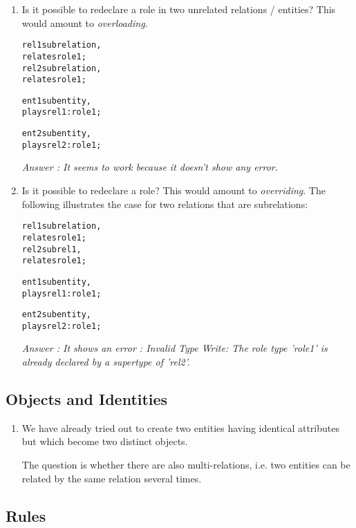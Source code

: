 \documentclass[runningheads]{llncs}
\begin{document}
\begin{enumerate}
\item Is it possible to redeclare a role in two unrelated relations /
  entities? This would amount to \emph{overloading}.

  \begin{alltt}
rel1 sub relation,
     relates role1;
rel2 sub relation,
     relates role1;

ent1 sub entity,
  plays rel1:role1;

ent2 sub entity,
  plays rel2:role1;
  \end{alltt}
  
 
\emph{Answer : It seems to work because it doesn't show any error. }
 
\item Is it possible to redeclare a role? This would amount to
  \emph{overriding}. The following illustrates the case for two relations that
  are subrelations:
  
  \begin{alltt}
rel1 sub relation,
     relates role1;
rel2 sub rel1,
     relates role1;

ent1 sub entity,
  plays rel1:role1;

ent2 sub entity,
  plays rel2:role1;
  \end{alltt}

\emph{Answer : It shows an error : Invalid Type Write: The role type 'role1' is already declared by a supertype of 'rel2'. }
  

\end{enumerate}


\subsection{Objects and Identities}

\begin{enumerate}
\item We have already tried out to create two entities having identical
  attributes but which become two distinct objects.

  The question is whether there are also multi-relations, i.e. two entities
  can be related by the same relation several times.
\end{enumerate}



\subsection{Rules}
\end{document}
